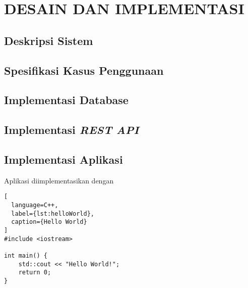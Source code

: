 \chapter{DESAIN DAN IMPLEMENTASI}
\vspace{4ex}

\setlength{\parindent}{7ex}


\section{Deskripsi Sistem}
\vspace{1ex}

\lipsum[1]
\vspace{0.5ex}

\section{Spesifikasi Kasus Penggunaan}

\lipsum[2]
\vspace{0.5ex}

\section{Implementasi Database}
\vspace{1ex}

\lipsum[3]
\vspace{0.5ex}

\section{Implementasi \emph{REST API}}
\vspace{1ex}

\lipsum[4]
\vspace{0.5ex}

\section{Implementasi Aplikasi}
\vspace{1ex}

Aplikasi diimplementasikan dengan \lipsum[2]
\vspace{0.5ex}

\newpage

\begin{lstlisting}[
  language=C++,
  label={lst:helloWorld},
  caption={Hello World}
]
#include <iostream>

int main() {
    std::cout << "Hello World!";
    return 0;
}
\end{lstlisting}
\vspace{0.5ex}

